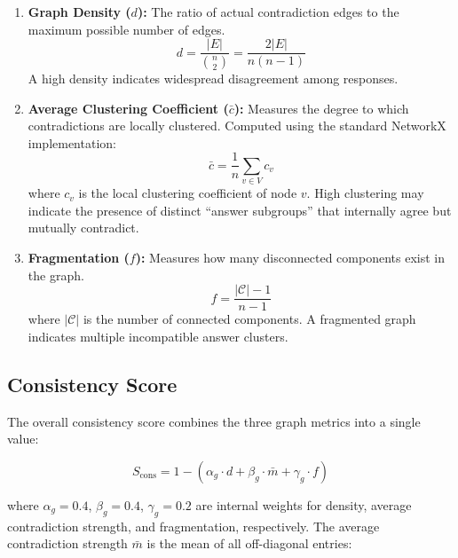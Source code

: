 \begin{enumerate}
    \item \textbf{Graph Density ($d$):} The ratio of actual contradiction edges to the maximum possible number of edges.
    \begin{equation}
        d = \frac{|E|}{\binom{n}{2}} = \frac{2|E|}{n(n-1)}
    \end{equation}
    A high density indicates widespread disagreement among responses.

    \item \textbf{Average Clustering Coefficient ($\bar{c}$):} Measures the degree to which contradictions are locally clustered. Computed using the standard NetworkX implementation:
    \begin{equation}
        \bar{c} = \frac{1}{n} \sum_{v \in V} c_v
    \end{equation}
    where $c_v$ is the local clustering coefficient of node $v$. High clustering may indicate the presence of distinct ``answer subgroups'' that internally agree but mutually contradict.

    \item \textbf{Fragmentation ($f$):} Measures how many disconnected components exist in the graph.
    \begin{equation}
        f = \frac{|\mathcal{C}| - 1}{n - 1}
    \end{equation}
    where $|\mathcal{C}|$ is the number of connected components. A fragmented graph indicates multiple incompatible answer clusters.
\end{enumerate}

\subsection{Consistency Score}

The overall consistency score combines the three graph metrics into a single value:

\begin{equation}
    S_{\text{cons}} = 1 - \left( \alpha_g \cdot d + \beta_g \cdot \bar{m} + \gamma_g \cdot f \right)
    \label{eq:consistency_score}
\end{equation}

\noindent
where $\alpha_g = 0.4$, $\beta_g = 0.4$, $\gamma_g = 0.2$ are internal weights for density, average contradiction strength, and fragmentation, respectively. The average contradiction strength $\bar{m}$ is the mean of all off-diagonal entries:

